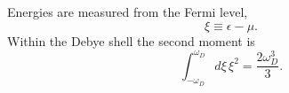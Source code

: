 \documentclass{article}
\begin{document}
Energies are measured from the Fermi level,
\begin{equation}
\xi \equiv \epsilon - \mu .
\label{eq:xi}
\end{equation}
Within the Debye shell the second moment is
\begin{equation}
\int_{-\omega_D}^{\omega_D} d\xi\, \xi^2 = \frac{2\omega_D^3}{3} .
\label{eq:mom}
\end{equation}
\end{document}
